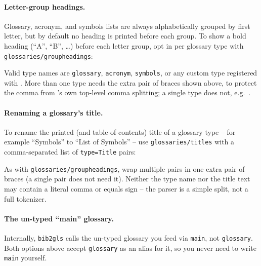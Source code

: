 \paragraph{Letter-group headings.} Glossary, acronym, and symbols lists are
always alphabetically grouped by first letter, but by default no heading is
printed before each group. To show a bold heading (\enquote{A},
\enquote{B}, \dots) before each letter group, opt in per glossary type with
\texttt{glossaries/groupheadings}:
\begin{latexcode}
\end{latexcode}
Valid type names are \texttt{glossary}, \texttt{acronym}, \texttt{symbols},
or any custom type registered with
. More than one type needs
the extra pair of braces shown above, to protect the comma from
\latexinline{\ntsetup}'s own top-level comma splitting; a single type does
not, e.g.\ .

\paragraph{Renaming a glossary's title.} To rename the printed (and
table-of-contents) title of a glossary type -- for example \enquote{Symbols}
to \enquote{List of Symbols} -- use \texttt{glossaries/titles} with a
comma-separated list of \texttt{type=Title} pairs:
\begin{latexcode}
\end{latexcode}
As with \texttt{glossaries/groupheadings}, wrap multiple pairs in one extra
pair of braces (a single pair does not need it). Neither the type name nor
the title text may contain a literal comma or equals sign -- the parser is a
simple split, not a full tokenizer.

\paragraph{The un-typed \enquote{main} glossary.} Internally,
\texttt{bib2gls} calls the un-typed glossary you feed via
 \texttt{main}, not
\texttt{glossary}. Both options above accept \texttt{glossary} as an alias
for it, so you never need to write \texttt{main} yourself.



